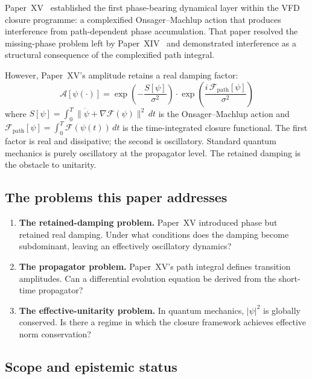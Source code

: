 \documentclass[12pt]{article}
\newcommand{\Fcal}{\mathcal{F}}
\begin{document}
Paper~XV~\citep{SmartXV} established the first phase-bearing dynamical layer within the VFD closure programme: a complexified Onsager--Machlup action that produces interference from path-dependent phase accumulation. That paper resolved the missing-phase problem left by Paper~XIV~\citep{SmartXIV} and demonstrated interference as a structural consequence of the complexified path integral.

However, Paper~XV's amplitude retains a real damping factor:
\begin{equation}\label{eq:XV_amplitude}
    \mathcal{A}[\psi(\cdot)] = \exp\!\left(-\frac{S[\psi]}{\sigma^2}\right) \cdot \exp\!\left(\frac{i\, \Fcal_{\mathrm{path}}[\psi]}{\sigma^2}\right)
\end{equation}
where $S[\psi] = \int_0^T \|\dot{\psi} + \nabla\Fcal(\psi)\|^2\, dt$ is the Onsager--Machlup action and $\Fcal_{\mathrm{path}}[\psi] = \int_0^T \Fcal(\psi(t))\, dt$ is the time-integrated closure functional. The first factor is real and dissipative; the second is oscillatory. Standard quantum mechanics is purely oscillatory at the propagator level. The retained damping is the obstacle to unitarity.

\subsection*{The problems this paper addresses}

\begin{enumerate}
    \item[(P5)] \textbf{The retained-damping problem.} Paper~XV introduced phase but retained real damping. Under what conditions does the damping become subdominant, leaving an effectively oscillatory dynamics?

    \item[(P6)] \textbf{The propagator problem.} Paper~XV's path integral defines transition amplitudes. Can a differential evolution equation be derived from the short-time propagator?

    \item[(P7)] \textbf{The effective-unitarity problem.} In quantum mechanics, $|\psi|^2$ is globally conserved. Is there a regime in which the closure framework achieves effective norm conservation?
\end{enumerate}

\subsection*{Scope and epistemic status}
\end{document}
